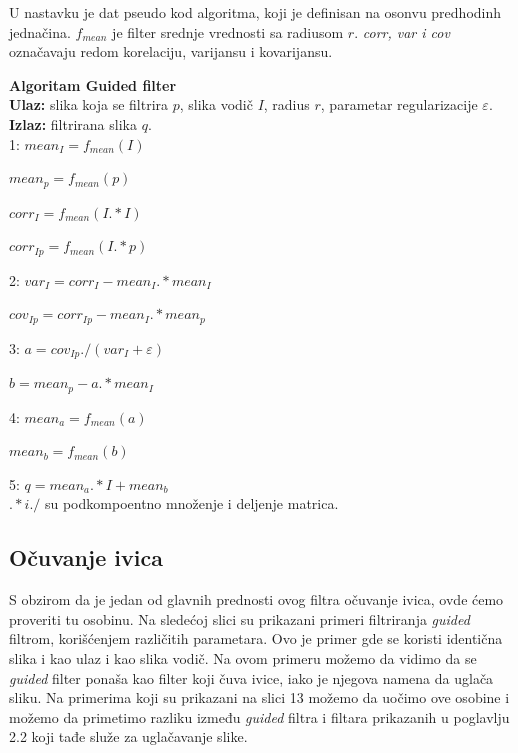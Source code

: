 \documentclass[a4paper,12pt,titlepage]{article}
\begin{document}
U nastavku je dat pseudo kod algoritma, koji je definisan na osonvu predhodinh jednačina. $f_{mean}$ je filter srednje vrednosti sa radiusom $r$. \emph{corr, var i cov} označavaju redom korelaciju, varijansu i kovarijansu. 

\newpage

\textbf{Algoritam Guided filter}\\

\textbf{Ulaz:} slika koja se filtrira $p$, slika vodič $I$, radius $r$, parametar regularizacije $\varepsilon$.\\

\textbf{Izlaz:} filtrirana slika $q$.\\

1: $mean_I = f_{mean}(I)$

\hspace{4mm} $mean_p = f_{mean}(p)$

\hspace{4mm} $corr_I = f_{mean}(I .* I)$

\hspace{4mm} $corr_{Ip} = f_{mean}(I .* p)$

2: $var_I = corr_I - mean_I .* mean_I$

\hspace{4mm}  $cov_{Ip} = corr_{Ip} - mean_I .* mean_p$

3: $a = cov_{Ip} ./ (var_I + \varepsilon)$

\hspace{4mm} $b = mean_p - a .*  mean_I$

4: $mean_a = f_{mean}(a)$

\hspace{4mm} $mean_b = f_{mean}(b)$

5: $q = mean_a .* I + mean_b$\\

$ .*  i  ./ $ su podkompoentno množenje i deljenje matrica.


\subsection{Očuvanje ivica}%

S obzirom da je jedan od glavnih prednosti ovog filtra očuvanje ivica, ovde ćemo proveriti tu osobinu. Na sledećoj slici su prikazani primeri filtriranja \emph{guided} filtrom, korišćenjem različitih parametara. Ovo je primer gde se koristi identična slika i kao ulaz i kao slika vodič. Na ovom primeru možemo da vidimo da se \emph{guided} filter ponaša kao filter koji čuva ivice, iako je njegova namena da uglača sliku. 
Na primerima koji su prikazani na slici 13 možemo da uočimo ove osobine i možemo da primetimo razliku između \emph{guided} filtra i filtara prikazanih u poglavlju 2.2 koji tađe služe za uglačavanje slike.
\end{document}
